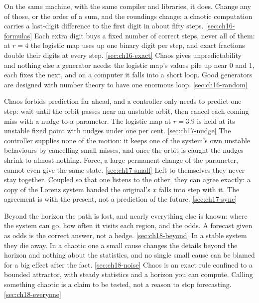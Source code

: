 %
  {On the same machine, with the same compiler and libraries, it does. Change any of those, or the order of a sum, and the roundings change; a chaotic computation carries a last-digit difference to the first digit in about fifty steps.}%
  {\ref{sec:ch16-formulas}}
%
  {Each extra digit buys a fixed number of correct steps, never all of them: at $r = 4$ the logistic map uses up one binary digit per step, and exact fractions double their digits at every step.}%
  {\ref{sec:ch16-exact}}
%
  {Chaos gives unpredictability and nothing else a generator needs: the logistic map's values pile up near $0$ and $1$, each fixes the next, and on a computer it falls into a short loop. Good generators are designed with number theory to have one enormous loop.}%
  {\ref{sec:ch16-random}}

%
  {Chaos forbids prediction far ahead, and a controller only needs to predict one step: wait until the orbit passes near an unstable orbit, then cancel each coming miss with a nudge to a parameter. The logistic map at $r = \num{3.9}$ is held at its unstable fixed point with nudges under one per cent.}%
  {\ref{sec:ch17-nudge}}
%
  {The controller supplies none of the motion: it keeps one of the system's own unstable behaviours by cancelling small misses, and once the orbit is caught the nudges shrink to almost nothing. Force, a large permanent change of the parameter, cannot even give the same state.}%
  {\ref{sec:ch17-small}}
%
  {Left to themselves they never stay together. Coupled so that one listens to the other, they can agree exactly: a copy of the Lorenz system handed the original's $x$ falls into step with it. The agreement is with the present, not a prediction of the future.}%
  {\ref{sec:ch17-sync}}

%
  {Beyond the horizon the path is lost, and nearly everything else is known: where the system can go, how often it visits each region, and the odds. A forecast given as odds is the correct answer, not a hedge.}%
  {\ref{sec:ch18-beyond}}
%
  {In a stable system they die away. In a chaotic one a small cause changes the details beyond the horizon and nothing about the statistics, and no single small cause can be blamed for a big effect after the fact.}%
  {\ref{sec:ch18-noise}}
%
  {Chaos is an exact rule confined to a bounded attractor, with steady statistics and a horizon you can compute. Calling something chaotic is a claim to be tested, not a reason to stop forecasting.}%
  {\ref{sec:ch18-everyone}}
